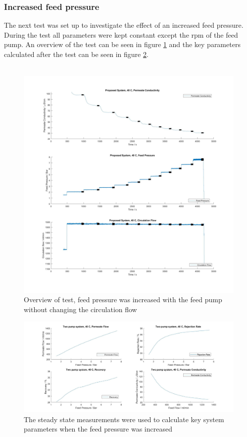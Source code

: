 \subsubsection{Increased feed pressure}
The next test was set up to investigate the effect of an increased feed pressure. During the test all parameters were kept constant except the rpm of the feed pump. An overview of the test can be seen in figure \ref{fig:FeedPumpIncrease40} and the key parameters calculated after the test can be seen in figure \ref{fig:FeedPumpIncrease40Key}.\\
\\
\begin{figure}[H]
    \centering
    \includegraphics[width=1.1\textwidth]{FeedPumpIncrease40}
    \caption{Overview of test, feed pressure was increased with the feed pump without changing the circulation flow}
    \label{fig:FeedPumpIncrease40}
\end{figure}

\begin{figure}[H]
    \centering
    \includegraphics[width=1.1\textwidth]{FeedPumpIncrease40Key}
    \caption{The steady state measurements were used to calculate key system parameters when the feed pressure was increased}
    \label{fig:FeedPumpIncrease40Key}
\end{figure}

